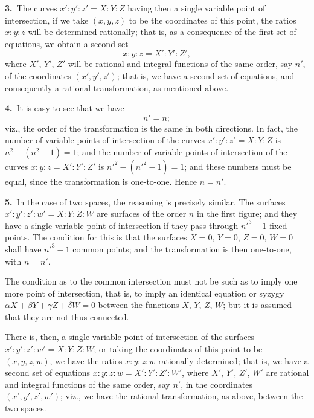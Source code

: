 \documentclass[11pt,a4paper]{article}
\begin{document}
\textbf{3.}\ The curves $x' : y' : z' = X : Y : Z$ having then a single variable point of intersection, if we take $(x, y, z)$ to be the coordinates of this point, the ratios $x : y : z$ will be determined rationally; that is, as a consequence of the first set of equations, we obtain a second set
\[
x : y : z = X' : Y' : Z',
\]
where $X'$, $Y'$, $Z'$ will be rational and integral functions of the same order, say $n'$, of the coordinates $(x', y', z')$; that is, we have a second set of equations, and consequently a rational transformation, as mentioned above.

\textbf{4.}\ It is easy to see that we have
\[
n' = n;
\]
viz., the order of the transformation is the same in both directions. In fact, the number of variable points of intersection of the curves $x' : y' : z' = X : Y : Z$ is $n^2 - (n^2 - 1) = 1$; and the number of variable points of intersection of the curves $x : y : z = X' : Y' : Z'$ is $n'^2 - (n'^2 - 1) = 1$; and these numbers must be equal, since the transformation is one-to-one. Hence $n = n'$.

\newpage
\setcounter{page}{192}

\noindent\textbf{5.}\ In the case of two spaces, the reasoning is precisely similar. The surfaces $x' : y' : z' : w' = X : Y : Z : W$ are surfaces of the order $n$ in the first figure; and they have a single variable point of intersection if they pass through $n'^3 - 1$ fixed points. The condition for this is that the surfaces $X = 0$, $Y = 0$, $Z = 0$, $W = 0$ shall have $n'^3 - 1$ common points; and the transformation is then one-to-one, with $n = n'$.

The condition as to the common intersection must not be such as to imply one more point of intersection, that is, to imply an identical equation or syzygy $\alpha X + \beta Y + \gamma Z + \delta W = 0$ between the functions $X$, $Y$, $Z$, $W$; but it is assumed that they are not thus connected.

There is, then, a single variable point of intersection of the surfaces $x' : y' : z' : w' = X : Y : Z : W$; or taking the coordinates of this point to be $(x, y, z, w)$, we have the ratios $x : y : z : w$ rationally determined; that is, we have a second set of equations $x : y : z : w = X' : Y' : Z' : W'$, where $X'$, $Y'$, $Z'$, $W'$ are rational and integral functions of the same order, say $n'$, in the coordinates $(x', y', z', w')$; viz., we have the rational transformation, as above, between the two spaces.
\end{document}
